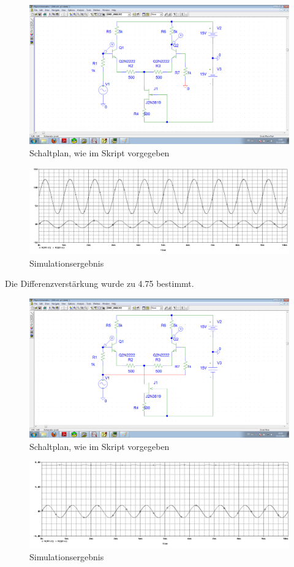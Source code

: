 \begin{figure}[H]
	\centering
	\includegraphics[width=\linewidth]{versuch6/spice/schem614.png}
	\caption{Schaltplan, wie im Skript vorgegeben}
\end{figure}
\begin{figure}[H]
	\centering
	\includegraphics[width=\linewidth]{versuch6/spice/614.png}
	\caption{Simulationsergebnis}
\end{figure}
Die Differenzverstärkung wurde zu 4.75 bestimmt.
\begin{figure}[H]
	\centering
	\includegraphics[width=\linewidth]{versuch6/spice/schem615.png}
	\caption{Schaltplan, wie im Skript vorgegeben}
\end{figure}
\begin{figure}[H]
	\centering
	\includegraphics[width=\linewidth]{versuch6/spice/615.png}
	\caption{Simulationsergebnis}
\end{figure}
